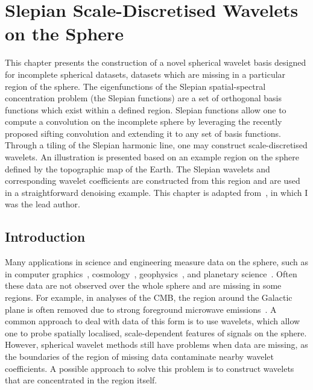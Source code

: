 \chapter{Slepian Scale-Discretised Wavelets on the Sphere}\label{sec:chapter4}

This chapter presents the construction of a novel spherical wavelet basis designed for incomplete spherical datasets, \ie{} datasets which are missing in a particular region of the sphere.
The eigenfunctions of the Slepian spatial-spectral concentration problem (the Slepian functions) are a set of orthogonal basis functions which exist within a defined region.
Slepian functions allow one to compute a convolution on the incomplete sphere by leveraging the recently proposed sifting convolution and extending it to any set of basis functions.
Through a tiling of the Slepian harmonic line, one may construct scale-discretised wavelets.
An illustration is presented based on an example region on the sphere defined by the topographic map of the Earth.
The Slepian wavelets and corresponding wavelet coefficients are constructed from this region and are used in a straightforward denoising example.
This chapter is adapted from~\cite{Roddy2021a}, in which I was the lead author.

\section{Introduction}

Many applications in science and engineering measure data on the sphere, such as in computer graphics~\cite{Ramamoorthi2004}, cosmology~\cite{Bennett1996}, geophysics~\cite{Simons2006}, and planetary science~\cite{Turcotte1981}.
Often these data are not observed over the whole sphere and are missing in some regions.
For example, in analyses of the CMB, the region around the Galactic plane is often removed due to strong foreground microwave emissions~\cite{Mortlock2002}.
A common approach to deal with data of this form is to use wavelets, which allow one to probe spatially localised, scale-dependent features of signals on the sphere.
However, spherical wavelet methods still have problems when data are missing, as the boundaries of the region of missing data contaminate nearby wavelet coefficients.
A possible approach to solve this problem is to construct wavelets that are concentrated in the region itself.

